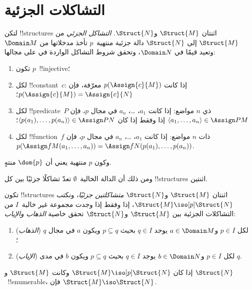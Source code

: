 \documentclass[../../../include/open-logic-section]{subfiles}
\begin{document}
\section{التشاكلات الجزئية}

\begin{defn}
  لتكن !!{structure}s اثنتان $\Struct{M}$ و$\Struct{N}$. \emph{التشاكل
  الجزئي} من $\Struct{M}$ إلى $\Struct{N}$ دالة جزئية منتهية~$p$ تأخذ
  مدخلاتها من $\Domain M$ وتعيد قيمًا في $\Domain N$، وتحقق شروط التشاكل
  الواردة في  على مجالها:
  \begin{enumerate}
  \item تكون $p$~!!{injective}؛
  \item لكل !!{constant}~$c$: إذا كانت $p(\Assign{c}{M})$ معرّفة، فإن
    $p(\Assign{c}{M}) = \Assign{c}{N}$؛
  \item لكل !!{predicate}~$P$ ذي $n$ مواضع: إذا كانت $a_1$، \dots،
    $a_n$ في مجال $p$، فإن $\langle a_1, \dots, a_n\rangle \in
    \Assign P M$ إذا وفقط إذا كان
    $\langle p(a_1), \dots, p(a_n) \rangle \in \Assign P N$؛
  \item لكل !!{function}~$f$ ذات $n$ مواضع: إذا كانت $a_1$، \dots،
    $a_n$ في مجال $p$، فإن $p(\Assign f M (a_1, \dots,a_n))
    = \Assign f N (p(a_1), \dots, p(a_n))$.
  \end{enumerate}
  وكون $p$ منتهية يعني أن $\dom{p}$ منتهٍ.
\end{defn}

ومن ذلك أن الدالة الخالية~$\emptyset$ تعدّ تشاكلًا جزئيًا بين كل
!!{structure}s اثنتين.

\begin{defn}
  تكون !!{structure}s اثنتان $\Struct{M}$ و$\Struct{N}$
  \emph{متشاكلتين جزئيًا}، ونكتب $\Struct{M} \iso[p] \Struct{N}$، إذا
  وفقط إذا وجدت مجموعة غير خالية~$I$ من التشاكلات الجزئية بين
  $\Struct{M}$ و$\Struct{N}$ تحقق خاصية \emph{الذهاب والإياب}:
  \begin{enumerate}
  \item (\emph{الذهاب}) لكل $p \in I$ و$a \in \Domain M$ يوجد
    $q \in I$ بحيث $p \subseteq q$ ويكون $a$ في مجال $q$؛
  \item (\emph{الإياب}) لكل $p \in I$ و$b \in \Domain N$ يوجد
    $q \in I$ بحيث $p \subseteq q$ ويكون $b$ في مدى $q$.
  \end{enumerate}
\end{defn}

\begin{thm}
  إذا كان $\Struct{M} \iso[p] \Struct{N}$ وكانت $\Struct{M}$ و
  $\Struct{N}$~!!{enumerable}، فإن $\Struct{M} \iso \Struct{N}$.
\end{thm}
\end{document}
